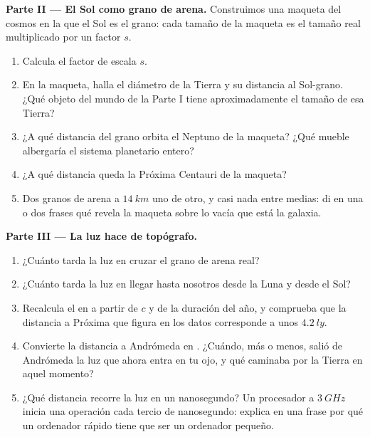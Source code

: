 \begin{problem}
\medskip
\noindent\textbf{Parte II --- El Sol como grano de arena.}
Construimos una maqueta del cosmos en la que el Sol es el grano: cada
tamaño de la maqueta es el tamaño real multiplicado por un factor $s$.
\begin{enumerate}[resume]
  \item Calcula el factor de escala $s$.
  \item En la maqueta, halla el diámetro de la Tierra y su distancia al
        Sol-grano. ¿Qué objeto del mundo de la Parte I tiene
        aproximadamente el tamaño de esa Tierra?
  \item ¿A qué distancia del grano orbita el Neptuno de la maqueta? ¿Qué
        mueble albergaría el sistema planetario entero?
  \item ¿A qué distancia queda la Próxima Centauri de la maqueta?
  \item Dos granos de arena a $\qty{14}{km}$ uno de otro, y casi nada
        entre medias: di en una o dos frases qué revela la maqueta sobre
        lo vacía que está la galaxia.
\end{enumerate}

\medskip
\noindent\textbf{Parte III --- La luz hace de topógrafo.}
\begin{enumerate}[resume]
  \item ¿Cuánto tarda la luz en cruzar el grano de arena real?
  \item ¿Cuánto tarda la luz en llegar hasta nosotros desde la Luna y
        desde el Sol?
  \item Recalcula el  en  a partir de $c$ y de la duración
        del año, y comprueba que la distancia a Próxima que figura en
        los datos corresponde a unos $\qty{4.2}{ly}$.
  \item Convierte la distancia a Andrómeda en . ¿Cuándo, más o
        menos, salió de Andrómeda la luz que ahora entra en tu ojo, y
        qué caminaba por la Tierra en aquel momento?
  \item ¿Qué distancia recorre la luz en un nanosegundo? Un procesador a
        $\qty{3}{GHz}$ inicia una operación cada tercio de nanosegundo:
        explica en una frase por qué un ordenador rápido tiene que ser
        un ordenador pequeño.
\end{enumerate}


\end{problem}
